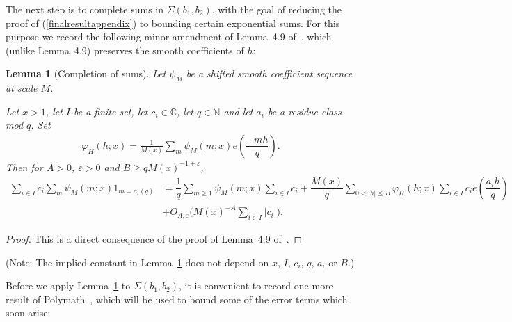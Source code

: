 \documentclass{amsart}
\newtheorem{lemma}{Lemma}
\numberwithin{equation}{section}
\begin{document}
The next step is to complete sums in   $\Sigma(b_1,b_2)$, with the goal of reducing the proof of (\ref{finalresultappendix}) to bounding certain exponential sums. For this purpose we record the following minor amendment of Lemma~4.9 of~\cite{Polymath:2014:EDZ}, which (unlike Lemma~4.9) preserves the smooth coefficients of $h$: 

\begin{lemma}[Completion of sums]\label{lem:amendment4.9}
Let  $\psi_M$ be a shifted smooth coefficient sequence at scale $M$. 


Let $x>1$,  
let $I$ be a finite set, let $c_i \in \mathbb{C}$, let $q \in \mathbb{N}$ and let $a_i$ be a residue class mod $q$.  Set 
\begin{align} \label{def:psitophi}
\varphi_H(h;x)= \frac{1}{M(x)}
\sum_m \psi_M(m;x)   e\left(\dfrac{-mh}{q} \right). 
\end{align}
Then for $A > 0$,  $\varepsilon>0$ and $B\geq qM(x)^{-1+\varepsilon}$,
\begin{align*}
\sum_{i \in I} c_i \sum_m \psi_M(m;x) 1_{m =a_i (q)} &=\dfrac{1}{q} \sum_{m \geq 1} \psi_M(m;x) \sum_{i \in I}c_i + \dfrac{M(x)}{q}\sum_{0 < |h| \leq B} \varphi_H(h;x) \sum_{i \in I}c_i  e\left(\dfrac{a_i h}{q} \right) \nonumber \\ &+ O_{A,\varepsilon}\Big(M(x)^{-A} \sum_{i \in I} |c_i|\Big)
. 
\end{align*}
\end{lemma}
\begin{proof}
This is a direct consequence of the proof of Lemma~4.9 of~\cite{Polymath:2014:EDZ}.
\end{proof}

(Note: The implied constant in Lemma~\ref{lem:amendment4.9} does not depend on $x$, $I$, $c_i$, $q$, $a_i$ or $B$.)

\vspace{3mm}


Before we apply Lemma~\ref{lem:amendment4.9} to $\Sigma(b_1,b_2)$,  it is convenient to record one more result of Polymath~\cite{Polymath:2014:EDZ}, which will be used to bound some of the error terms which soon arise: 
\end{document}
